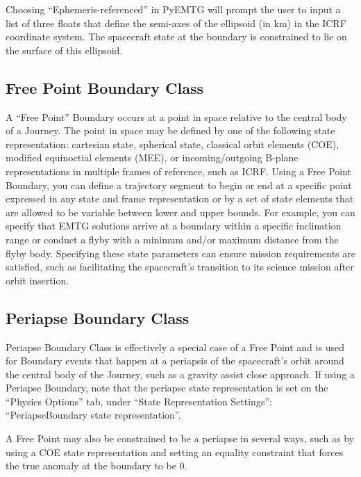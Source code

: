 \documentclass[11pt]{article}
\begin{document}
\noindent Choosing ``Ephemeris-referenced'' in PyEMTG will prompt the user to input a list of three floats that define the semi-axes of the ellipsoid (in km) in the \acs{ICRF} coordinate system. The spacecraft state at the boundary is constrained to lie on the surface of this ellipsoid.


\subsection{Free Point Boundary Class}
\label{sec:free_point_boundary_class}

A ``Free Point'' Boundary occurs at a point in space relative to the central body of a Journey. The point in space may be defined by one of the following state representation: cartesian state, spherical state, classical orbit elements (COE), modified equinoctial elements (MEE), or incoming/outgoing B-plane representations in multiple frames of reference, such as \acs{ICRF}. Using a Free Point Boundary, you can define a trajectory segment to begin or end at a specific point expressed in any state and frame representation or by a set of state elements that are allowed to be variable between lower and upper bounds. For example, you can specify that \ac{EMTG} solutions arrive at a boundary within a specific inclination range or conduct a flyby with a minimum and/or maximum distance from the flyby body. Specifying these state parameters can ensure mission requirements are satisfied, such as facilitating the spacecraft’s transition to its science mission after orbit insertion. 

\subsection{Periapse Boundary Class}
\label{sec:periapse_boundary_class}

Periapse Boundary Class is effectively a special case of a Free Point and is used for Boundary events that happen at a periapsis of the spacecraft’s orbit around the central body of the Journey, such as a gravity assist close approach. If using a Periapse Boundary, note that the periapse state representation is set on the ``Physics Options'' tab, under ``State Representation Settings'': ``PeriapseBoundary state representation''.

\noindent A Free Point may also be constrained to be a periapse in several ways, such as by using a COE state representation and setting an equality constraint that forces the true anomaly at the boundary to be 0.
\end{document}
